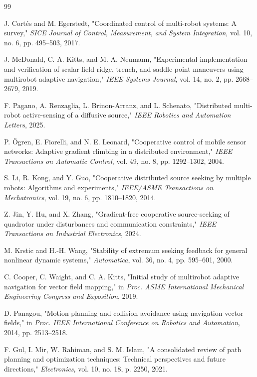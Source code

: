 \documentclass[lettersize,journal]{IEEEtran}
\begin{document}

\begin{thebibliography}{99}

 J. Cortés and M. Egerstedt, "Coordinated control of multi-robot systems: A survey," \textit{SICE Journal of Control, Measurement, and System Integration}, vol. 10, no. 6, pp. 495--503, 2017.

 J. McDonald, C. A. Kitts, and M. A. Neumann, "Experimental implementation and verification of scalar field ridge, trench, and saddle point maneuvers using multirobot adaptive navigation," \textit{IEEE Systems Journal}, vol. 14, no. 2, pp. 2668--2679, 2019.

 F. Pagano, A. Renzaglia, L. Brinon-Arranz, and L. Schenato, "Distributed multi-robot active-sensing of a diffusive source," \textit{IEEE Robotics and Automation Letters}, 2025.

 P. Ögren, E. Fiorelli, and N. E. Leonard, "Cooperative control of mobile sensor networks: Adaptive gradient climbing in a distributed environment," \textit{IEEE Transactions on Automatic Control}, vol. 49, no. 8, pp. 1292--1302, 2004.

 S. Li, R. Kong, and Y. Guo, "Cooperative distributed source seeking by multiple robots: Algorithms and experiments," \textit{IEEE/ASME Transactions on Mechatronics}, vol. 19, no. 6, pp. 1810--1820, 2014.

 Z. Jin, Y. Hu, and X. Zhang, "Gradient-free cooperative source-seeking of quadrotor under disturbances and communication constraints," \textit{IEEE Transactions on Industrial Electronics}, 2024.

 M. Krstic and H.-H. Wang, "Stability of extremum seeking feedback for general nonlinear dynamic systems," \textit{Automatica}, vol. 36, no. 4, pp. 595--601, 2000.

 C. Cooper, C. Waight, and C. A. Kitts, "Initial study of multirobot adaptive navigation for vector field mapping," in \textit{Proc. ASME International Mechanical Engineering Congress and Exposition}, 2019.

 D. Panagou, "Motion planning and collision avoidance using navigation vector fields," in \textit{Proc. IEEE International Conference on Robotics and Automation}, 2014, pp. 2513--2518.

 F. Gul, I. Mir, W. Rahiman, and S. M. Islam, "A consolidated review of path planning and optimization techniques: Technical perspectives and future directions," \textit{Electronics}, vol. 10, no. 18, p. 2250, 2021.


\end{thebibliography}
\end{document}
